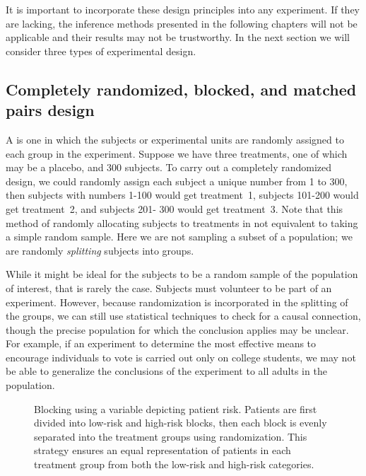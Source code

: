 It is important to incorporate these design principles into any experiment. If they are lacking, the inference methods presented in the following chapters will not be applicable and their results may not be trustworthy. In the next section we will consider three types of experimental design.


\subsection{Completely randomized, blocked, and matched pairs design}
\label{CompletelyRandomizedBlockedAndMatchedPairsDesign}


A  is one in which the subjects or experimental units are randomly assigned to each group in the experiment. Suppose we have three treatments, one of which may be a placebo, and 300 subjects. To carry out a completely randomized design, we could randomly assign each subject a unique number from 1 to 300, then subjects with numbers 1-100 would get treatment~1, subjects 101-200 would get treatment~2, and subjects 201- 300 would get treatment~3. Note that this method of randomly allocating subjects to treatments in not equivalent to taking a simple random sample. Here we are not sampling a subset of a population; we are randomly \emph{splitting} subjects into groups.


While it might be ideal for the subjects to be a random sample of the population of interest, that is rarely the case. Subjects must volunteer to be part of an experiment. However, because randomization is incorporated in the splitting of the groups, we can still use statistical techniques to check for a causal connection, though the precise population for which the conclusion applies may be unclear. For example, if an experiment to determine the most effective means to encourage individuals to vote is carried out only on college students, we may not be able to generalize the conclusions of the experiment to all adults in the population.

\begin{figure}
\centering
{}
\caption{Blocking using a variable depicting patient risk. Patients are first divided into low-risk and high-risk blocks, then each block is evenly separated into the treatment groups using randomization. This strategy ensures an equal representation of patients in each treatment group from both the low-risk and high-risk categories.}
\label{figureShowingBlocking}
\end{figure}

